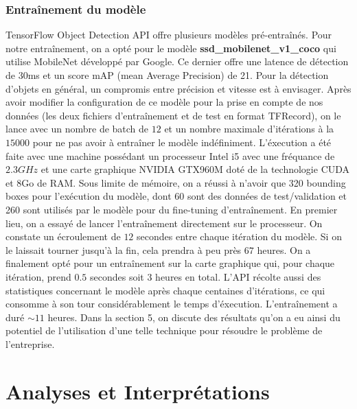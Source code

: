\documentclass[french]{article}
\theoremstyle{mytheoremstyle}
\theoremstyle{mytheoremstyle}
\theoremstyle{myproblemstyle}
\begin{document}
        \subsubsection{Entraînement du modèle}
        TensorFlow Object Detection API offre plusieurs modèles pré-entraînés. Pour notre entraînement, on a opté pour le modèle \textbf{ssd\_mobilenet\_v1\_coco}\cite{pretrainedmodel} qui utilise MobileNet développé par Google. Ce dernier offre une latence de détection de 30ms et un score mAP (mean Average Precision) de 21. Pour la détection d'objets en général, un compromis entre précision et vitesse est à envisager. Après avoir modifier la configuration de ce modèle pour la prise en compte de nos données (les deux fichiers d'entraînement et de test en format TFRecord), on le lance avec un nombre de batch de $12$ et un nombre maximale d'itérations à la $15 000$ pour ne pas avoir à entraîner le modèle indéfiniment. L'éxecution a été faite avec une machine possédant un processeur Intel i5 avec une fréquance de $2.3GHz$ et une carte graphique NVIDIA GTX960M doté de la technologie CUDA et 8Go de RAM. Sous limite de mémoire, on a réussi à n'avoir que 320 bounding boxes pour l'exécution du modèle, dont 60 sont des données de test/validation et 260 sont utilisés par le modèle pour du fine-tuning d'entraînement. En premier lieu, on a essayé de lancer l'entraînement directement sur le processeur. On constate un écroulement de $12$ secondes entre chaque itération du modèle. Si on le laissait tourner jusqu'à la fin, cela prendra à peu près $67$ heures. On a finalement opté pour un entraînement sur la carte graphique qui, pour chaque itération, prend $0.5$ secondes soit $3$ heures en total. L'API récolte aussi des statistiques concernant le modèle après chaque centaines d'itérations, ce qui consomme à son tour considérablement le temps d'éxecution.
        \newline
        \indent L'entraînement a duré $\sim 11$ heures. Dans la section 5, on discute des résultats qu'on a eu ainsi du potentiel de l'utilisation d'une telle technique pour résoudre le problème de l'entreprise.

    \section{Analyses et Interprétations}
\end{document}
